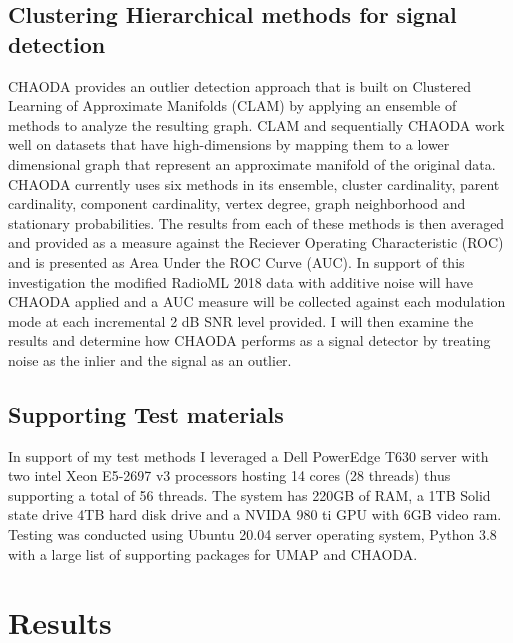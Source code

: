 \documentclass[conference]{IEEEtran}
\begin{document}
\subsection{Clustering Hierarchical methods for signal detection}
CHAODA provides an outlier detection approach that is built on Clustered Learning of Approximate Manifolds (CLAM) by applying an ensemble of methods to analyze the resulting graph.  CLAM and sequentially CHAODA work well on datasets that have high-dimensions by mapping them to a lower dimensional graph that represent an approximate manifold of the original data.  CHAODA currently uses six methods in its ensemble, cluster cardinality, parent cardinality, component cardinality, vertex degree, graph neighborhood and stationary probabilities.  The results from each of these methods is then averaged and provided as a measure against the Reciever Operating Characteristic (ROC) and is presented as Area Under the ROC Curve (AUC). In support of this investigation the modified RadioML 2018 data with additive noise will have CHAODA applied and a AUC measure will be collected against each modulation mode at each incremental 2 dB SNR level provided.  I will then examine the results and determine how CHAODA performs as a signal detector by treating noise as the inlier and the signal as an outlier.  

\subsection{Supporting Test materials}
In support of my test methods I leveraged a Dell PowerEdge T630 server with two intel Xeon E5-2697 v3 processors hosting 14 cores (28 threads) thus supporting a total of 56 threads.  The system has 220GB of RAM, a 1TB Solid state drive 4TB hard disk drive and a NVIDA 980 ti GPU with 6GB video ram.  Testing was conducted using Ubuntu 20.04 server operating system, Python 3.8 with a large list of supporting packages for UMAP and CHAODA.

\section{Results}
\end{document}
